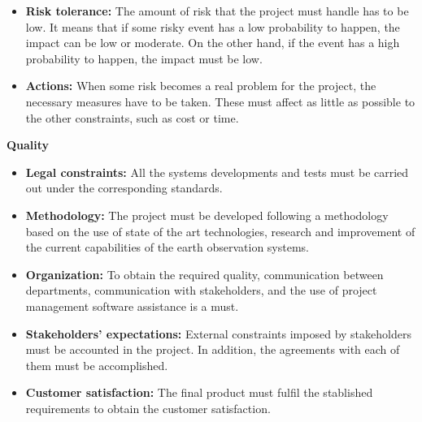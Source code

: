 \begin{itemize}
	
	\item \textbf{Risk tolerance:} The amount of risk that the project must handle has to be low. It means that if some risky event has a low probability to happen, the impact can be low or moderate. On the other hand, if the event has a high probability to happen, the impact must be low.
	
	\item \textbf{Actions:} When some risk becomes a real problem for the project, the necessary measures have to be taken. These must affect as little as possible to the other constraints, such as cost or time.
	
\end{itemize}

\textbf{Quality}

\begin{itemize}
	
	\item \textbf{Legal constraints:} All the systems developments and tests must be carried out under the corresponding standards. 
	
	\item \textbf{Methodology:} The project must be developed following a methodology based on the use of state of the art technologies, research and improvement of the current capabilities of the earth observation systems.
	
	\item \textbf{Organization:} To obtain the required quality, communication between departments, communication with stakeholders, and the use of project management software assistance is a must.
	
	\item \textbf{Stakeholders’ expectations:} External constraints imposed by stakeholders must be accounted in the project. In addition, the agreements with each of them must be accomplished.
	
	\item \textbf{Customer satisfaction:} The final product must fulfil the stablished requirements to obtain the customer satisfaction.
	
\end{itemize}